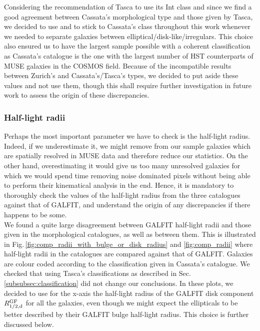 Considering the recommendation of Tasca to use its Int class and since we find a good agreement between Cassata's morphological type and those given by Tasca, we decided to use and to stick to Cassata's class throughout this work whenever we needed to separate galaxies between elliptical/disk-like/irregulars. This choice also ensured us to have the largest sample possible with a coherent classification as Cassata's catalogue is the one with the largest number of HST counterparts of MUSE galaxies in the COSMOS field. Because of the incompatible results between Zurich's and Cassata's/Tasca's types, we decided to put aside these values and not use them, though this shall require further investigation in future work to assess the origin of these discrepancies.

\subsubsection{Half-light radii}
\label{sec:comp_radii}

Perhaps the most important parameter we have to check is the half-light radius. Indeed, if we underestimate it, we might remove from our sample galaxies which are spatially resolved in MUSE data and therefore reduce our statistics. On the other hand, overestimating it would give us too many unresolved galaxies for which we would spend time removing noise dominated pixels without being able to perform their kinematical analysis in the end. Hence, it is mandatory to thoroughly check the values of the half-light radius from the three catalogues against that of GALFIT, and understand the origin of any discrepancies if there happens to be some. \\

We found a quite large disagreement between GALFIT half-light radii and those given in the morphological catalogues, as well as between them. This is illustrated in Fig.\,\ref{fig:comp_radii_with_bulge_or_disk_radius} and \ref{fig:comp_radii} where half-light radii in the catalogues are compared against that of GALFIT. Galaxies are colour coded according to the classification given in Cassata's catalogue. We checked that using Tasca's classifications as described in Sec.\,\ref{subsubsec:classification} did not change our conclusions. In these plots, we decided to use for the x-axis the half-light radius of the GALFIT disk component $R_{1/2 , \rm{d}}^{\rm{GF}}$ for all the galaxies, even though we might expect the ellipticals to be better described by their GALFIT bulge half-light radius. This choice is further discussed below.\\

